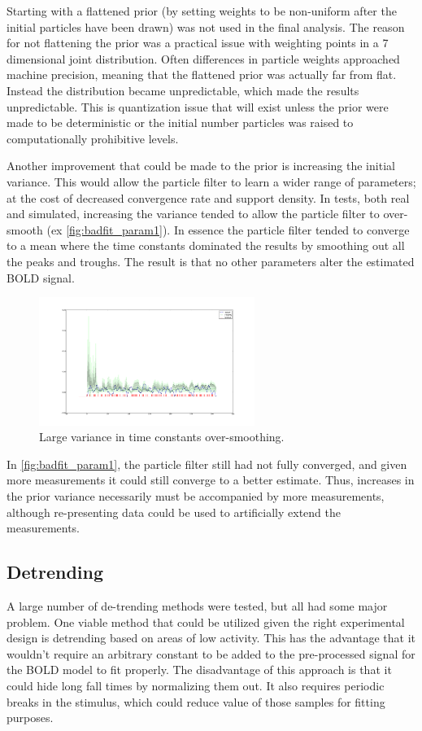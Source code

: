 Starting with a flattened
prior (by setting weights to be non-uniform after the initial particles have
been drawn) was not used in the final analysis. The reason for not flattening
the prior was a practical issue with weighting points in a 
7 dimensional joint distribution. Often differences in particle weights approached machine 
precision, meaning that the flattened prior was actually far from flat. Instead
the distribution became unpredictable, which made the results unpredictable. This
is quantization issue that will exist unless the prior were made to be deterministic
or the initial number particles was raised to computationally prohibitive levels.

Another improvement that could be made to the prior is increasing the initial variance.
This would allow the particle filter to learn a wider range of parameters; at the cost
of decreased convergence rate and support density. In tests, both real and simulated,
increasing the variance tended to allow the particle filter to over-smooth 
(ex \autoref{fig:badfit_param1}). In 
essence the particle filter tended to converge to a mean where the time constants
dominated the results by smoothing out all the peaks and troughs. The result is that
no other parameters alter the estimated BOLD signal. 
\begin{figure}
\includegraphics[clip=true,trim=6cm 2cm 6cm 3.5cm,width=7cm]{images/badfit_param1}
\caption{Large variance in time constants over-smoothing.}
\label{fig:badfit_param1}
\end{figure}
In \autoref{fig:badfit_param1}, the particle filter still had not fully converged, and
given more measurements it could still converge to a better estimate. Thus, increases
in the prior variance necessarily must be accompanied by more measurements,
although re-presenting data could be used to artificially extend the measurements. 

\subsection{Detrending}
A large number of de-trending methods were tested, but all had some major problem. 
One viable method that could be utilized given the right experimental design is detrending
based on areas of low activity. This has the advantage that it wouldn't require an arbitrary
constant to be added to the pre-processed signal for the BOLD model to fit properly.
The disadvantage of this approach is that it could hide long fall times by normalizing them
out. It also requires periodic breaks in the stimulus, which could reduce value of those
samples for fitting purposes. 

